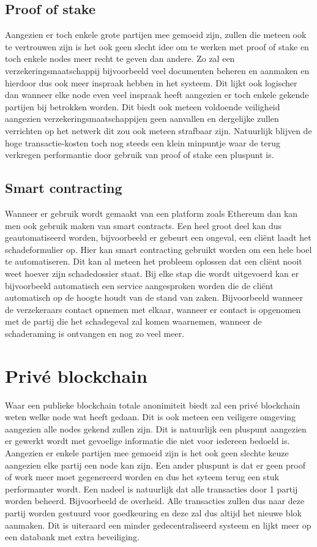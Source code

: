 \subsection{Proof of stake}
Aangezien er toch enkele grote partijen mee gemoeid zijn, zullen die meteen ook te vertrouwen zijn is het ook geen slecht idee om te werken met proof of stake en toch enkele nodes meer recht te geven dan andere. Zo zal een verzekeringsmaatschappij bijvoorbeeld veel documenten beheren en aanmaken en hierdoor dus ook meer inspraak hebben in het systeem. Dit lijkt ook logischer dan wanneer elke node even veel inspraak heeft aangezien er toch enkele gekende partijen bij betrokken worden. Dit biedt ook meteen voldoende veiligheid aangezien verzekeringsmaatschappijen geen aanvallen en dergelijke zullen verrichten op het netwerk dit zou ook meteen strafbaar zijn. Natuurlijk blijven de hoge transactie-kosten toch nog steeds een klein minpuntje waar de terug verkregen performantie door gebruik van proof of stake een pluspunt is. 

\subsection{Smart contracting}
Wanneer er gebruik wordt gemaakt van een platform zoals Ethereum dan kan men ook gebruik maken van smart contracts. Een heel groot deel kan dus geautomatiseerd worden, bijvoorbeeld er gebeurt een ongeval, een cliënt laadt het schadeformulier op. Hier kan smart contracting gebruikt worden om een hele boel te automatiseren. Dit kan al meteen het probleem oplossen dat een cliënt nooit weet hoever zijn schadedossier staat. Bij elke stap die wordt uitgevoerd kan er bijvoorbeeld automatisch een service aangesproken worden die de cliënt automatisch op de hoogte houdt van de stand van zaken. Bijvoorbeeld wanneer de verzekeraars contact opnemen met elkaar, wanneer er contact is opgenomen met de partij die het schadegeval zal komen waarnemen, wanneer de schaderaming is ontvangen en nog zo veel meer. 

\section{Privé blockchain}
Waar een publieke blockchain totale anonimiteit biedt zal een privé blockchain weten welke node wat heeft gedaan. Dit is ook meteen een veiligere omgeving aangezien alle nodes gekend zullen zijn. Dit is natuurlijk een pluspunt aangezien er gewerkt wordt met gevoelige informatie die niet voor iedereen bedoeld is. Aangezien er enkele partijen mee gemoeid zijn is het ook geen slechte keuze aangezien elke partij een node kan zijn. Een ander pluspunt is dat er geen proof of work meer moet gegenereerd worden en dus het syteem terug een stuk performanter wordt. Een nadeel is natuurlijk dat alle transacties door 1 partij worden beheerd. Bijvoorbeeld de overheid. Alle transacties zullen dus naar deze partij worden gestuurd voor goedkeuring en deze zal dus altijd het nieuwe blok aanmaken. Dit is uiteraard een minder gedecentraliseerd systeem en lijkt meer op een databank met extra beveiliging. 

